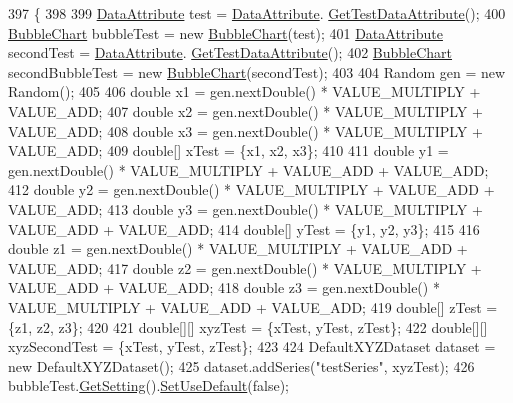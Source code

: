 \begin{DoxyCode}
397                                              \{
398     
399         \hyperlink{class_data_attribute}{DataAttribute} test = \hyperlink{class_data_attribute}{DataAttribute}.
      \hyperlink{class_data_attribute_a9c7a1923698c1530fa38c959596199bc}{GetTestDataAttribute}();
400         \hyperlink{class_bubble_chart}{BubbleChart} bubbleTest = \textcolor{keyword}{new} \hyperlink{class_bubble_chart_a90418fabcda19061a4d395f18ee5f48d}{BubbleChart}(test);
401         \hyperlink{class_data_attribute}{DataAttribute} secondTest = \hyperlink{class_data_attribute}{DataAttribute}.
      \hyperlink{class_data_attribute_a9c7a1923698c1530fa38c959596199bc}{GetTestDataAttribute}();
402         \hyperlink{class_bubble_chart}{BubbleChart} secondBubbleTest = \textcolor{keyword}{new} \hyperlink{class_bubble_chart_a90418fabcda19061a4d395f18ee5f48d}{BubbleChart}(secondTest);
403         
404         Random gen = \textcolor{keyword}{new} Random();
405         
406         \textcolor{keywordtype}{double} x1 = gen.nextDouble() * VALUE\_MULTIPLY + VALUE\_ADD;
407         \textcolor{keywordtype}{double} x2 = gen.nextDouble() * VALUE\_MULTIPLY + VALUE\_ADD;
408         \textcolor{keywordtype}{double} x3 = gen.nextDouble() * VALUE\_MULTIPLY + VALUE\_ADD;
409         \textcolor{keywordtype}{double}[] xTest = \{x1, x2, x3\};      
410         
411         \textcolor{keywordtype}{double} y1 = gen.nextDouble() * VALUE\_MULTIPLY + VALUE\_ADD + VALUE\_ADD;
412         \textcolor{keywordtype}{double} y2 = gen.nextDouble() * VALUE\_MULTIPLY + VALUE\_ADD + VALUE\_ADD;
413         \textcolor{keywordtype}{double} y3 = gen.nextDouble() * VALUE\_MULTIPLY + VALUE\_ADD + VALUE\_ADD;
414         \textcolor{keywordtype}{double}[] yTest = \{y1, y2, y3\};
415         
416         \textcolor{keywordtype}{double} z1 = gen.nextDouble() * VALUE\_MULTIPLY + VALUE\_ADD + VALUE\_ADD;
417         \textcolor{keywordtype}{double} z2 = gen.nextDouble() * VALUE\_MULTIPLY + VALUE\_ADD + VALUE\_ADD;
418         \textcolor{keywordtype}{double} z3 = gen.nextDouble() * VALUE\_MULTIPLY + VALUE\_ADD + VALUE\_ADD;
419         \textcolor{keywordtype}{double}[] zTest = \{z1, z2, z3\};
420         
421         \textcolor{keywordtype}{double}[][] xyzTest = \{xTest, yTest, zTest\};
422         \textcolor{keywordtype}{double}[][] xyzSecondTest = \{xTest, yTest, zTest\};
423         
424         DefaultXYZDataset dataset = \textcolor{keyword}{new} DefaultXYZDataset();
425         dataset.addSeries(\textcolor{stringliteral}{"testSeries"}, xyzTest);
426         bubbleTest.\hyperlink{class_bubble_chart_ad4ed746599c2a16959123ca77d7bea58}{GetSetting}().\hyperlink{class_data_attribute_a46b8473768d9ba3609e5f5994e903a7c}{SetUseDefault}(\textcolor{keyword}{false});

\end{DoxyCode}
